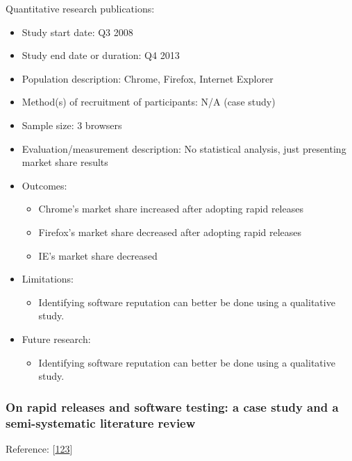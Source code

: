 \documentclass[]{book}
\providecommand{\tightlist}{%
  \setlength{\itemsep}{0pt}\setlength{\parskip}{0pt}}
\begin{document}
Quantitative research publications:

\begin{itemize}
\tightlist
\item
  Study start date: Q3 2008
\item
  Study end date or duration: Q4 2013
\item
  Population description: Chrome, Firefox, Internet Explorer
\item
  Method(s) of recruitment of participants: N/A (case study)
\item
  Sample size: 3 browsers
\item
  Evaluation/measurement description: No statistical analysis, just
  presenting market share results
\item
  Outcomes:

  \begin{itemize}
  \tightlist
  \item
    Chrome's market share increased after adopting rapid releases
  \item
    Firefox's market share decreased after adopting rapid releases
  \item
    IE's market share decreased
  \end{itemize}
\item
  Limitations:

  \begin{itemize}
  \tightlist
  \item
    Identifying software reputation can better be done using a
    qualitative study.
  \end{itemize}
\item
  Future research:

  \begin{itemize}
  \tightlist
  \item
    Identifying software reputation can better be done using a
    qualitative study.
  \end{itemize}
\end{itemize}

\subsubsection{On rapid releases and software testing: a case study and
a semi-systematic literature
review}\label{on-rapid-releases-and-software-testing-a-case-study-and-a-semi-systematic-literature-review}

Reference: {[}\protect\hyperlink{ref-mantyla2015a}{123}{]}
\end{document}

